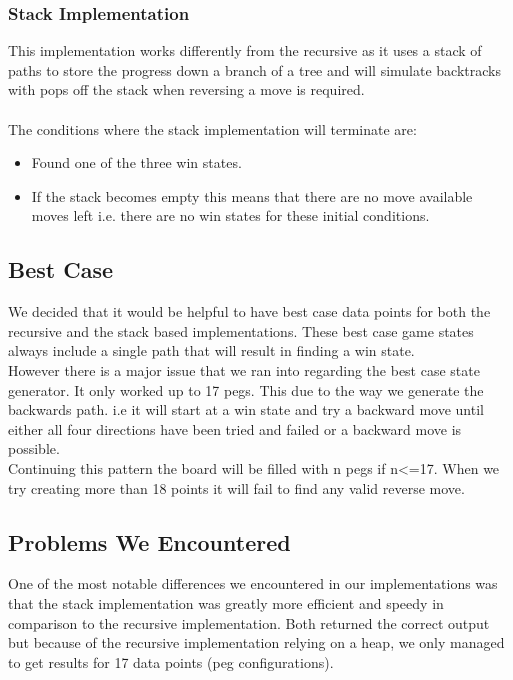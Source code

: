 \documentclass[a4paper]{article}
\begin{document}
\subsubsection{Stack Implementation}
This implementation works differently from the recursive as it uses a stack of paths to store the progress down a branch of a tree and will simulate backtracks with pops off the stack when reversing a move is required.\\\\

\noindent The conditions where the stack implementation will terminate are:
\begin{itemize}
\item Found one of the three win states.
\item If the stack becomes empty this means that there are no move available moves left i.e. there are no win states for these initial conditions.
\end{itemize}

\subsection{Best Case}
We decided that it would be helpful to have best case data points for both the recursive and the stack based implementations. These best case game states always include a single path that will result in finding a win state.\\

\noindent However there is a major issue that we ran into regarding the best case state generator. It only worked up to 17 pegs. This due to the way we generate the backwards path. i.e it will start at a win state and try a backward move until either all four directions have been tried and failed or a backward move is possible.\\

\noindent Continuing this pattern the board will be filled with n pegs if n<=17. When we try creating more than 18 points it will fail to find any valid reverse move.


\subsection{Problems We Encountered}
One of the most notable differences we encountered in our implementations was that the stack implementation was greatly more efficient and speedy in comparison to the recursive implementation. Both returned the correct output but because of the recursive implementation relying on a heap, we only managed to get results for 17 data points (peg configurations). \\
\end{document}
